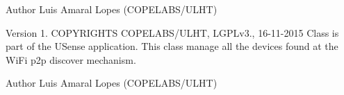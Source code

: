 \begin{DoxyAuthor}{Author}
Luis Amaral Lopes (C\+O\+P\+E\+L\+A\+B\+S/\+U\+L\+H\+T)
\end{DoxyAuthor}
\begin{DoxyVersion}{Version}
1. C\+O\+P\+Y\+R\+I\+G\+H\+T\+S C\+O\+P\+E\+L\+A\+B\+S/\+U\+L\+H\+T, L\+G\+P\+Lv3., 16-\/11-\/2015 Class is part of the U\+Sense application. This class manage all the devices found at the Wi\+Fi p2p discover mechanism. 
\end{DoxyVersion}
\begin{DoxyAuthor}{Author}
Luis Amaral Lopes (C\+O\+P\+E\+L\+A\+B\+S/\+U\+L\+H\+T) 
\end{DoxyAuthor}

